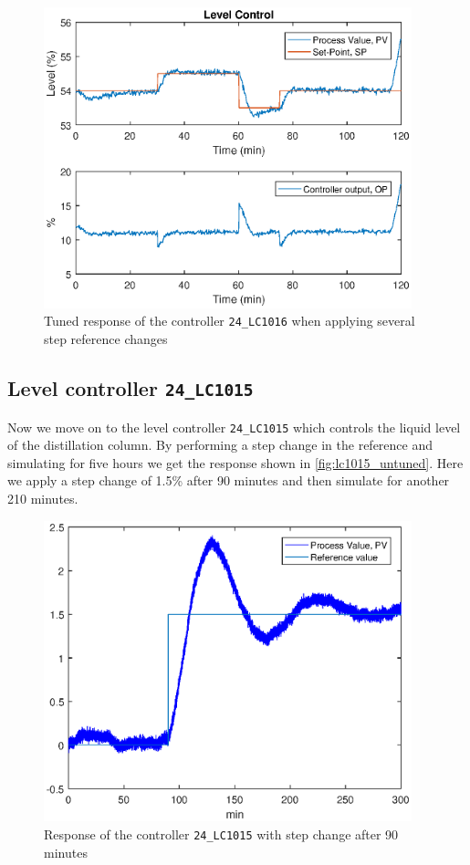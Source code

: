 \begin{figure}[ht!]
	\centering
	\includegraphics[width=0.95\textwidth]{fig/identification/lc1016_tuned.eps}
	\caption{Tuned response of the controller \texttt{24\_LC1016} when applying several step reference changes}
	\label{fig:lc1016_tuned}
\end{figure}

\subsection{Level controller \texttt{24\_LC1015}}
Now we move on to the level controller \texttt{24\_LC1015} which controls the liquid level of the distillation column. By performing a step change in the reference and simulating for five hours we get the response shown in \autoref{fig:lc1015_untuned}. Here we apply a step change of 1.5\% after 90 minutes and then simulate for another 210 minutes.

\begin{figure}[ht!]
	\centering
	\includegraphics[width=0.95\textwidth]{fig/identification/lc1015_simulation_untuned.eps}
	\caption{Response of the controller \texttt{24\_LC1015} with step change after 90 minutes}
	\label{fig:lc1015_untuned}
\end{figure}


